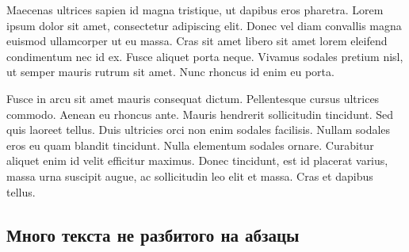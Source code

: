 Maecenas ultrices sapien id magna tristique, ut dapibus eros pharetra. Lorem ipsum dolor sit amet, consectetur adipiscing elit. Donec vel diam convallis magna euismod ullamcorper ut eu massa. Cras sit amet libero sit amet lorem eleifend condimentum nec id ex. Fusce aliquet porta neque. Vivamus sodales pretium nisl, ut semper mauris rutrum sit amet. Nunc rhoncus id enim eu porta.

Fusce in arcu sit amet mauris consequat dictum. Pellentesque cursus ultrices commodo. Aenean eu rhoncus ante. Mauris hendrerit sollicitudin tincidunt. Sed quis laoreet tellus. Duis ultricies orci non enim sodales facilisis. Nullam sodales eros eu quam blandit tincidunt. Nulla elementum sodales ornare. Curabitur aliquet enim id velit efficitur maximus. Donec tincidunt, est id placerat varius, massa urna suscipit augue, ac sollicitudin leo elit et massa. Cras et dapibus tellus.

\subsection{Много текста не разбитого на абзацы}\label{subsec:chapter_2/section_1/subsection_4}

